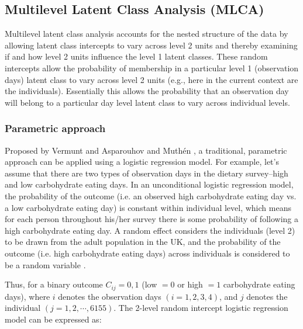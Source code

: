 
\subsection{Multilevel Latent Class Analysis (MLCA)}\vspace{-0.3cm}


Multilevel latent class analysis accounts for the nested structure of the data by allowing latent class intercepts to vary across level 2 units and thereby examining if and how level 2 units influence the level 1 latent classes. These random intercepts allow the probability of membership in a particular level 1 (observation days) latent class to vary across level 2 units (e.g., here in the current context are the individuals). Essentially this allows the probability that an observation day will belong to a
particular day level latent class to vary across individual levels.\vspace{-0.5cm}

\subsubsection{Parametric approach}\vspace{-0.3cm}

Proposed by Vermunt \parencite{Vermunt, vermunt2008latent} and Asparouhov and Muth\'en \parencite{muthen2009multilevel},  a traditional, parametric approach can be applied using a logistic regression model. For example, let's assume that there are two types of observation days in the dietary survey--high and low carbohydrate eating days. In an unconditional logistic regression model, the probability of the outcome (i.e. an observed high carbohydrate eating day vs. a low carbohydrate eating day) is constant within individual level, which means for each person throughout his/her survey there is some probability of following a high carbohydrate eating day. A random effect considers the individuals (level 2) to be drawn from the adult population in the UK, and the probability of the outcome (i.e. high carbohydrate eating days) across individuals is considered to be a random variable \parencite{snijders2011multilevel}. 

Thus, for a binary outcome $C_{ij} = 0, 1$ (low $=0$ or high $=1$ carbohydrate eating days), where $i$ denotes the observation days $(i = 1, 2, 3, 4)$, and $j$ denotes the individual $(j = 1, 2, \cdots, 6155)$. The 2-level random intercept logistic regression model can be expressed as:\vspace{-0.4cm}



